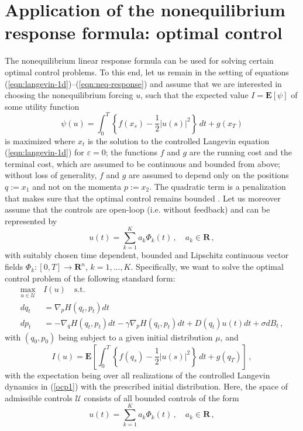 \documentclass[]{tMPH2e}
\newcommand{\recheck}[1]{{\color{red} #1}}
\newcommand{\redc}[1]{{\color{red} #1}}
\newcommand{\R}{{\mathbf R}}
\newcommand{\eps}{\varepsilon}
\newcommand{\cU}{\mathcal U}
\newcommand{\bE}{{\mathbf E}}
\begin{document}
\section{Application of the nonequilibrium response formula: optimal control}

The nonequilibrium linear response formula can be used for solving certain optimal control problems. To this end, let us remain in the setting of equations (\ref{eqn:langevin-1d})--(\ref{eqn:neq-response}) and assume that we are interested in choosing the nonequilibrium forcing $u$, such that the expected value $I=\bE[\psi]$ of some utility function 
\[
\psi(u) = \int_{0}^{T}\left\{f(x_{s}) - \frac{1}{2}|u(s)|^{2}\right\}\,dt + g(x_{T}) 
\]
is maximized where $x_{t}$ is the solution to the controlled Langevin equation (\ref{eqn:langevin-1d}) for $\eps=0$; the functions $f$ and $g$ are the running cost and the terminal cost, which are assumed to be continuous and bounded from above; without loss of generality, $f$ and $g$ are assumed to depend only on the positions $q:=x_{1}$ and not on the momenta $p:=x_{2}$. The quadratic term is a penalization that makes sure that the optimal control remains bounded \cite{schuette2012,hartmann2012}. Let us moreover assume that the controls are open-loop (i.e. without feedback) and can be represented by 
\[
u(t) = \sum_{k=1}^K a_k \Phi_k(t)\,,\quad a_{k}\in \R\,,
\]
with suitably chosen time dependent, bounded and Lipschitz continuous vector fields $\Phi_k\colon[0,T]\to\R^{n}$, $k=1,\ldots,K$. %
Specifically, we want to solve the optimal control problem of the following standard form: 
\begin{equation}\label{ocp1}
\begin{aligned}
 \max_{u\in\cU} \,& I(u)\quad \textrm{s.t.}\\
dq_t & =  \nabla_p H(q_t,p_t)dt\\
dp_t & =  -\nabla_q H(q_t,p_t)dt - \gamma \nabla_p H(q_t,p_t)dt + D(q_t)u(t) dt+\sigma dB_t\,,
\end{aligned}
\end{equation}
\redc{with $(q_0, p_0)$ being subject to a given initial distribution $\mu$, and}
\begin{equation}\label{ocp2}
I(u) = \bE\left[\int_{0}^{T}\left\{f(q_{s}) - \frac{1}{2}|u(s)|^{2}\right\}\,dt + g(q_{T}) \right]\,,
\end{equation}
with the expectation being over all realizations of the controlled Langevin dynamics in (\ref{ocp1}) with \recheck{the} prescribed initial distribution. Here, the space of admissible controls $\cU$ consists of all bounded controls of the form 
\begin{equation}\label{admissible}
u(t) = \sum_{k=1}^K a_k \Phi_k(t)\,,\quad a_{k}\in \R\,,
\end{equation}
\end{document}
